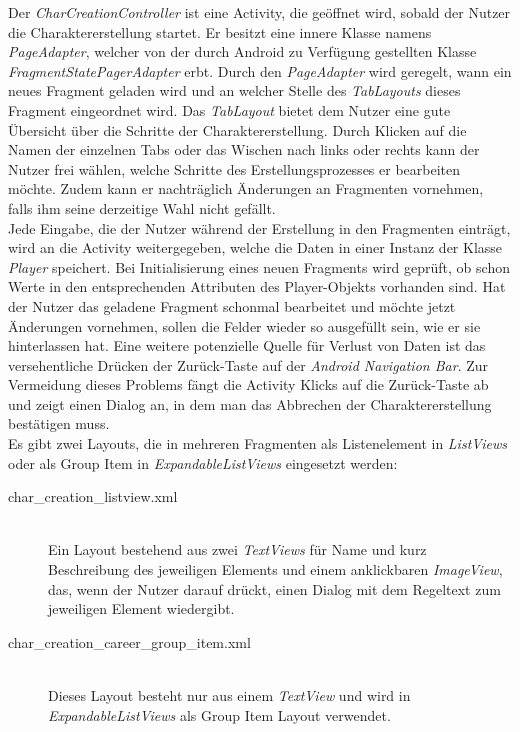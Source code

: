 Der \textit{CharCreationController} ist eine Activity, die geöffnet wird, sobald der Nutzer die Charaktererstellung startet. Er besitzt eine innere Klasse namens \textit{PageAdapter}, welcher von der durch Android zu Verfügung gestellten Klasse \textit{FragmentStatePagerAdapter} erbt. Durch den \textit{PageAdapter} wird geregelt, wann ein neues Fragment geladen wird und an welcher Stelle des \textit{TabLayouts} dieses Fragment eingeordnet wird. Das \textit{TabLayout} bietet dem Nutzer eine gute Übersicht über die Schritte der Charaktererstellung. Durch Klicken auf die Namen der einzelnen Tabs oder das Wischen nach links oder rechts kann der Nutzer frei wählen, welche Schritte des Erstellungsprozesses er bearbeiten möchte. Zudem kann er nachträglich Änderungen an Fragmenten vornehmen, falls ihm seine derzeitige Wahl nicht gefällt.\\

Jede Eingabe, die der Nutzer während der Erstellung in den Fragmenten einträgt, wird an die Activity weitergegeben, welche die Daten in einer Instanz der Klasse \textit{Player} speichert. Bei Initialisierung eines neuen Fragments wird geprüft, ob schon Werte in den entsprechenden Attributen des Player-Objekts vorhanden sind. Hat der Nutzer das geladene Fragment schonmal bearbeitet und möchte jetzt Änderungen vornehmen, sollen die Felder wieder so ausgefüllt sein, wie er sie hinterlassen hat. Eine weitere potenzielle Quelle für Verlust von Daten ist das versehentliche Drücken der Zurück-Taste auf der \textit{Android Navigation Bar}. Zur Vermeidung dieses Problems fängt die Activity Klicks auf die Zurück-Taste ab und zeigt einen Dialog an, in dem man das Abbrechen der Charaktererstellung bestätigen muss.\\

Es gibt zwei Layouts, die in mehreren Fragmenten als Listenelement in \textit{ListViews} oder als Group Item in \textit{ExpandableListViews} eingesetzt werden:
\begin{description}
\item[char\_creation\_listview.xml]\mbox{}\\
Ein Layout bestehend aus zwei \textit{TextViews} für Name und kurz Beschreibung des jeweiligen Elements und einem anklickbaren \textit{ImageView}, das, wenn der Nutzer darauf drückt, einen Dialog mit dem Regeltext zum jeweiligen Element wiedergibt.
\item[char\_creation\_career\_group\_item.xml]\mbox{}\\
Dieses Layout besteht nur aus einem \textit{TextView} und wird in \textit{ExpandableListViews} als Group Item Layout verwendet.
\end{description}

